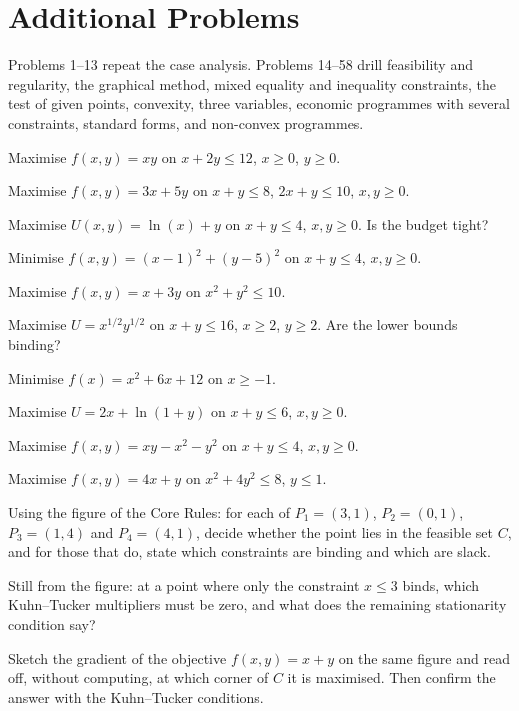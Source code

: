 \section{Additional Problems}

Problems 1--13 repeat the case analysis. Problems 14--58 drill feasibility
and regularity, the graphical method, mixed equality and inequality
constraints, the test of given points, convexity, three variables, economic
programmes with several constraints, standard forms, and non-convex
programmes.

\begin{problems}
  \item Maximise $f(x, y) = x y$ on $x + 2 y \leq 12$, $x \geq 0$,
        $y \geq 0$.
  \item Maximise $f(x, y) = 3 x + 5 y$ on $x + y \leq 8$,
        $2 x + y \leq 10$, $x, y \geq 0$.
  \item Maximise $U(x, y) = \ln(x) + y$ on $x + y \leq 4$, $x, y \geq 0$.
        Is the budget tight?
  \item Minimise $f(x, y) = (x - 1)^2 + (y - 5)^2$ on $x + y \leq 4$,
        $x, y \geq 0$.
  \item Maximise $f(x, y) = x + 3 y$ on $x^2 + y^2 \leq 10$.
  \item Maximise $U = x^{1/2} y^{1/2}$ on $x + y \leq 16$, $x \geq 2$,
        $y \geq 2$. Are the lower bounds binding?
  \item Minimise $f(x) = x^2 + 6 x + 12$ on $x \geq -1$.
  \item Maximise $U = 2 x + \ln(1 + y)$ on $x + y \leq 6$, $x, y \geq 0$.
  \item Maximise $f(x, y) = x y - x^2 - y^2$ on $x + y \leq 4$,
        $x, y \geq 0$.
  \item Maximise $f(x, y) = 4 x + y$ on $x^2 + 4 y^2 \leq 8$,
        $y \leq 1$.

  \item Using the figure of the Core Rules: for each of
        $P_{1}=(3,1)$, $P_{2}=(0,1)$, $P_{3}=(1,4)$ and $P_{4}=(4,1)$,
        decide whether the point lies in the feasible set $C$, and for
        those that do, state which constraints are binding and which are
        slack.
  \item Still from the figure: at a point where only the constraint
        $x\le3$ binds, which Kuhn--Tucker multipliers must be zero, and
        what does the remaining stationarity condition say?
  \item Sketch the gradient of the objective $f(x,y)=x+y$ on the same
        figure and read off, without computing, at which corner of $C$ it
        is maximised. Then confirm the answer with the Kuhn--Tucker
        conditions.


\end{problems}
